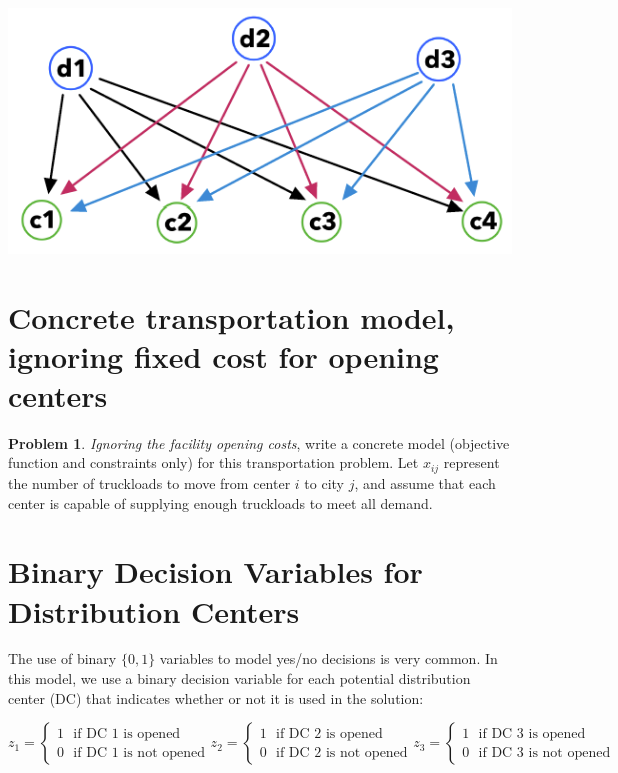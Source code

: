 \documentclass[11pt]{article}
\theoremstyle{definition}
\newtheorem{problem}{Problem}
\newcommand{\answerbox}[3]{%
  \fbox{%
    \begin{minipage}[#1]{#2}
      \hfill\vspace{#3}
    \end{minipage}
  }
}
\newcommand{\answerboxfull}[2]{%
  \answerbox{#1}{6.38in}{#2} 
}
\begin{document}
\begin{center}
\includegraphics[width=.7\textwidth]{network}
\end{center}

\newpage
\section{Concrete transportation model, ignoring fixed cost for opening centers}
\begin{problem}
\emph{Ignoring the facility opening costs}, write a concrete model (objective function and constraints only) for this transportation problem.  Let $x_{ij}$ represent the number of truckloads to move from center 
$i$ to city $j$, and assume that each center is capable of supplying enough truckloads to meet all demand.
\end{problem}

\answerboxfull{c}{2.8in}

\bigskip
\section{Binary Decision Variables for Distribution Centers}

The use of binary $\{0,1\}$ variables to model yes/no decisions is very common.  In this model, we use a binary decision variable for each potential distribution center (DC) that indicates whether or not it is used in the solution:


\[ 
z_1 = \begin{cases}  1 \text{~~if DC 1 is opened} \\ 0 \text{~~if DC 1 is not opened}\end{cases} 
z_2 = \begin{cases}  1 \text{~~if DC 2 is opened} \\ 0 \text{~~if DC 2 is not opened}\end{cases} 
z_3 = \begin{cases}  1 \text{~~if DC 3 is opened} \\ 0 \text{~~if DC 3 is not opened}\end{cases} 
\] 
\end{document}
